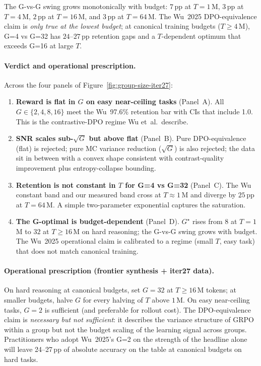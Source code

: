 The G-vs-G swing grows monotonically with budget: $7$\,pp at $T{=}1\,$M,
$3$\,pp at $T{=}4\,$M, $2$\,pp at $T{=}16\,$M, and $3$\,pp at
$T{=}64\,$M. The Wu~2025 DPO-equivalence claim is \emph{only true at
the lowest budget}; at canonical training budgets ($T \ge 4\,$M),
G=4 vs G=32 has $24$--$27$\,pp retention gaps and a $T$-dependent
optimum that exceeds G=16 at large $T$.

\paragraph{Verdict and operational prescription.}
Across the four panels of Figure~\ref{fig:group-size-iter27}:

\begin{enumerate}
  \item \textbf{Reward is flat in $G$ on easy near-ceiling tasks}
        (Panel~A). All $G\in\{2,4,8,16\}$ meet the Wu~97.6\%
        retention bar with CIs that include 1.0. This is the
        contrastive-DPO regime Wu et~al.\ describe.
  \item \textbf{SNR scales sub-$\sqrt{G}$ but above flat}
        (Panel~B). Pure DPO-equivalence (flat) is rejected; pure MC
        variance reduction ($\sqrt{G}$) is also rejected; the data
        sit in between with a convex shape consistent with
        contrast-quality improvement plus entropy-collapse bounding.
  \item \textbf{Retention is not constant in $T$ for G=4 vs G=32}
        (Panel~C). The Wu constant band and our measured band cross
        at $T{\approx}1\,$M and diverge by $25$\,pp at $T{=}64\,$M.
        A simple two-parameter exponential captures the saturation.
  \item \textbf{The G-optimal is budget-dependent}
        (Panel~D). $G^\star$ rises from $8$ at $T{=}1\,$M to $32$
        at $T{\ge}16\,$M on hard reasoning; the G-vs-G swing grows
        with budget. The Wu~2025 operational claim is calibrated to
        a regime (small $T$, easy task) that does not match canonical
        training.
\end{enumerate}

\paragraph{Operational prescription (frontier synthesis + iter27 data).}
On hard reasoning at canonical budgets, set $G{=}32$ at $T \ge 16\,$M
tokens; at smaller budgets, halve $G$ for every halving of $T$ above
$1\,$M. On easy near-ceiling tasks, $G{=}2$ is sufficient (and
preferable for rollout cost). The DPO-equivalence claim is
\emph{necessary but not sufficient}: it describes the variance
structure of GRPO within a group but not the budget scaling of the
learning signal across groups. Practitioners who adopt Wu~2025's
G=2 on the strength of the headline alone will leave 24--27\,pp of
absolute accuracy on the table at canonical budgets on hard tasks.

